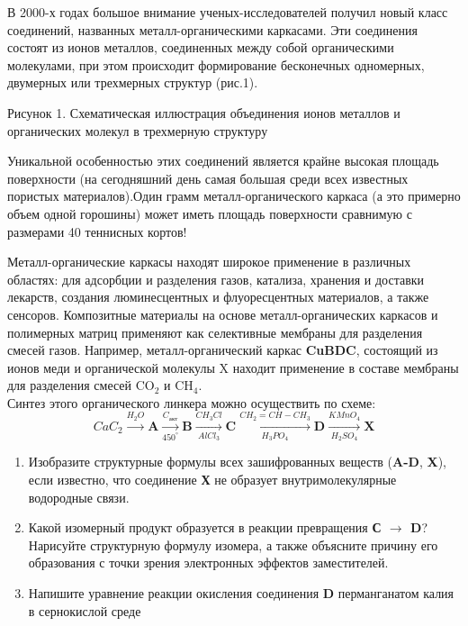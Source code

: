 
В 2000-х годах большое внимание ученых-исследователей получил новый класс соединений, названных металл-органическими каркасами. Эти соединения состоят из ионов металлов, соединенных между собой органическими молекулами, при этом происходит формирование бесконечных одномерных, двумерных или трехмерных структур (рис.1).


\begin{center}
    Рисунок 1. Схематическая иллюстрация объединения ионов металлов и органических молекул в трехмерную структуру
\end{center}


Уникальной особенностью этих соединений является крайне высокая площадь поверхности (на сегодняшний день самая большая среди всех известных пористых материалов).Один грамм металл-органического каркаса (а это примерно объем одной горошины) может иметь площадь поверхности сравнимую с размерами 40 теннисных кортов!

Металл-органические каркасы находят широкое применение в различных областях: для адсорбции и разделения газов, катализа, хранения и доставки лекарств, создания люминесцентных и флуоресцентных материалов, а также сенсоров. Композитные материалы на основе металл-органических каркасов и полимерных матриц применяют как селективные мембраны для разделения смесей газов. Например, металл-органический каркас \textbf{CuBDC}, состоящий из ионов меди и органической молекулы X находит применение в составе мембраны для разделения смесей CO$_2$ и CH$_4$.\\

Синтез этого органического линкера можно осуществить по схеме:
$$CaC_2\xrightarrow{H_2O}\textbf{A}\xrightarrow[450^{\circ}]{C_\text{акт}}\textbf{B}\xrightarrow[AlCl_3]{CH_3Cl}\textbf{C}\xrightarrow[H_3PO_4]{CH_2=CH-CH_3}\textbf{D}\xrightarrow[H_2SO_4]{KMnO_4}\textbf{X}$$
\begin{enumerate}
    \item Изобразите структурные формулы всех зашифрованных веществ (\textbf{A-D}, \textbf{X}), если известно, что соединение \textbf{Х} не образует внутримолекулярные водородные связи.
    \item Какой изомерный продукт образуется в реакции превращения \textbf{С $\rightarrow$ D}? Нарисуйте структурную формулу изомера, а также объясните причину его образования с точки зрения электронных эффектов заместителей.
    \item Напишите уравнение реакции окисления соединения \textbf{D} перманганатом калия в сернокислой среде
\end{enumerate}

